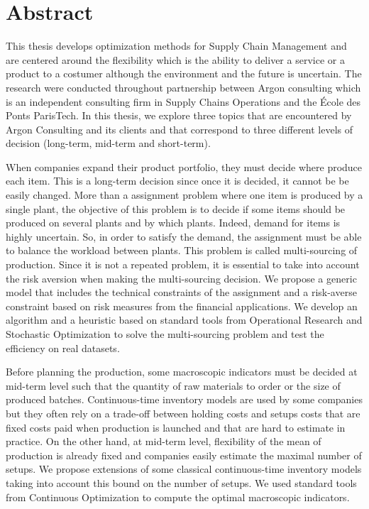 \chapter*{Abstract} %
\label{cha:abstract}



This thesis develops optimization methods for Supply Chain Management and are centered around the flexibility which is the ability to deliver a service or a product to a costumer although the environment and the future is uncertain.
The research were conducted throughout partnership between Argon consulting which is an independent consulting firm in Supply Chains Operations and the \'Ecole des Ponts ParisTech.
In this thesis, we explore three topics that are encountered by Argon Consulting and its clients and that correspond to three different levels of decision (long-term, mid-term and short-term).


When companies expand their product portfolio, they must decide where produce each item.
This is a long-term decision since once it is decided, it cannot be be easily changed.
More than a assignment problem where one item is produced by a single plant, the objective of this problem is to decide if some items should be produced on several plants and by which plants.
Indeed, demand for items is highly uncertain.
So, in order to satisfy the demand, the assignment must be able to balance the workload between plants.
This problem is called multi-sourcing of production.
Since it is not a repeated problem, it is essential to take into account the risk aversion when making the multi-sourcing decision.
We propose a generic model that includes the technical constraints of the assignment and a risk-averse constraint based on risk measures from the financial applications.
We develop an algorithm and a heuristic based on standard tools from Operational Research and Stochastic Optimization to solve the multi-sourcing problem and test the efficiency on real datasets.


Before planning the production, some macroscopic indicators must be decided at mid-term level such that the quantity of raw materials to order or the size of produced batches.
Continuous-time inventory models are used by some companies but they often rely on a trade-off between holding costs and setups costs that are fixed costs paid when production is launched and that are hard to estimate in practice.
On the other hand, at mid-term level, flexibility of the mean of production is already fixed and companies easily estimate the maximal number of setups.
We propose extensions of some classical continuous-time inventory models taking into account this bound on the number of setups.
We used standard tools from Continuous Optimization to compute the optimal macroscopic indicators.


